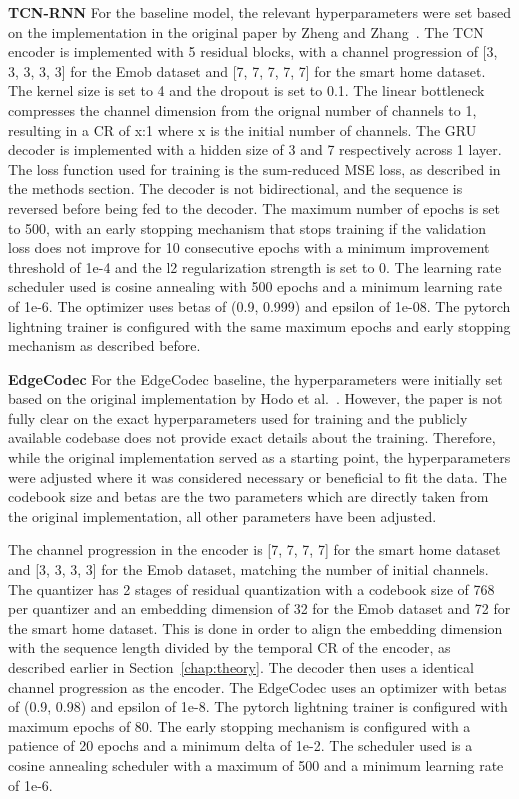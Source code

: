 \textbf{TCN-RNN} For the baseline model, the relevant hyperparameters were set based on the implementation in the original paper by Zheng and Zhang~\cite{Zheng2023}. The TCN encoder is implemented with 5 residual blocks, with a channel progression of [3, 3, 3, 3, 3] for the Emob dataset and [7, 7, 7, 7, 7] for the smart home dataset. The kernel size is set to 4 and the dropout is set to 0.1. The linear bottleneck compresses the channel dimension from the orignal number of channels to 1, resulting in a CR of x:1 where x is the initial number of channels. The GRU decoder is implemented with a hidden size of 3 and 7 respectively across 1 layer. The loss function used for training is the sum-reduced MSE loss, as described in the methods section. The decoder is not bidirectional, and the sequence is reversed before being fed to the decoder. The maximum number of epochs is set to 500, with an early stopping mechanism that stops training if the validation loss does not improve for 10 consecutive epochs with a minimum improvement threshold of 1e-4 and the l2 regularization strength is set to 0. The learning rate scheduler used is cosine annealing with 500 epochs and a minimum learning rate of 1e-6. The optimizer uses betas of (0.9, 0.999) and epsilon of 1e-08. The pytorch lightning trainer is configured with the same maximum epochs and early stopping mechanism as described before.

\textbf{EdgeCodec} For the EdgeCodec baseline, the hyperparameters were initially set based on the original implementation by Hodo et al.~\cite{Hodo2025}. However, the paper is not fully clear on the exact hyperparameters used for training and the publicly available codebase does not provide exact details about the training. Therefore, while the original implementation served as a starting point, the hyperparameters were adjusted where it was considered necessary or beneficial to fit the data. The codebook size and betas are the two parameters which are directly taken from the original implementation, all other parameters have been adjusted. 

The channel progression in the encoder is [7, 7, 7, 7] for the smart home dataset and [3, 3, 3, 3] for the Emob dataset, matching the number of initial channels. The quantizer has 2 stages of residual quantization with a codebook size of 768 per quantizer and an embedding dimension of 32 for the Emob dataset and 72 for the smart home dataset. This is done in order to align the embedding dimension with the sequence length divided by the temporal CR of the encoder, as described earlier in Section~\ref{chap:theory}. The decoder then uses a identical channel progression as the encoder. The EdgeCodec uses an optimizer with betas of (0.9, 0.98) and epsilon of 1e-8. The pytorch lightning trainer is configured with maximum epochs of 80. The early stopping mechanism is configured with a patience of 20 epochs and a minimum delta of 1e-2. The scheduler used is a cosine annealing scheduler with a maximum of 500 and a minimum learning rate of 1e-6.

